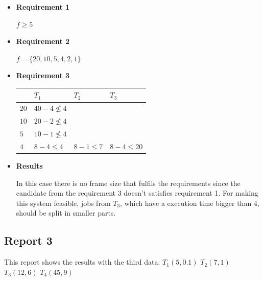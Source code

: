 \documentclass[12pt]{article}
\begin{document}
\begin{itemize}

\item \textbf{Requirement 1}

$f\geq5$

\item \textbf{Requirement 2}

$f=\{20,10,5,4,2,1\}$

\item \textbf{Requirement 3}

\begin{tabular}{ l | l l l  }
   & $T_{1}$ & $T_{2}$ & $T_{3}$ \\ \hline
  $20$ & $40 - 4 \nleq 4$ & &   \\
  $10$ & $20 - 2 \nleq 4$ & &   \\
  $5$ & $10 - 1 \nleq 4$ & &   \\
  $4$ & $8 - 4 \leq 4$ & $8 - 1 \leq 7$ & $8 - 4 \leq 20 $   \\

\end{tabular}

\item \textbf{Results}

In this case there is no frame size that fulfils the requirements since the candidate from the requirement 3 doesn't satisfies requirement 1. For making this system feasible, jobs from $T_{3}$, which have a execution time bigger than 4, should be split in smaller parts.

\end{itemize}


\subsection{Report 3}

This report shows the results with the third data: $T_{1}(5,0.1)$ $T_{2}(7,1)$ $T_{3}(12,6)$ $T_{4}(45,9)$
\end{document}
